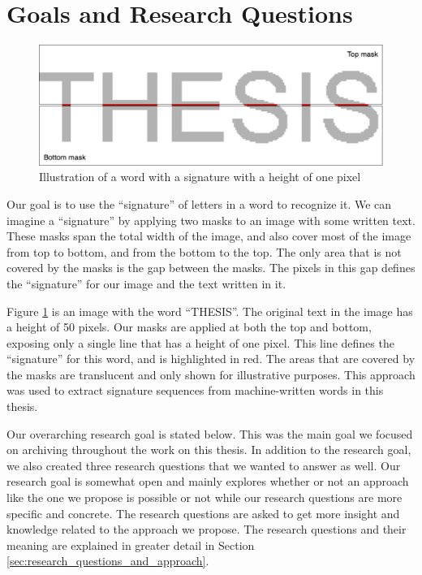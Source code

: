 
\section{Goals and Research Questions}
\label{sec:goals_and_research_questions}
\begin{figure}[ht]
    \centering
    \includegraphics[width=1.\textwidth]{fig/chapter1/signature2.png}
    \caption{Illustration of a word with a signature with a height of one pixel}
    \label{fig:thesis-signature}
\end{figure}

Our goal is to use the ``signature'' of letters in a word to recognize it. We can imagine a ``signature'' by applying two masks to an image with some written text. These masks span the total width of the image, and also cover most of the image from top to bottom, and from the bottom to the top. The only area that is not covered by the masks is the gap between the masks. The pixels in this gap defines the ``signature'' for our image and the text written in it.

Figure \ref{fig:thesis-signature} is an image with the word ``THESIS''. The original text in the image has a height of 50 pixels. Our masks are applied at both the top and bottom, exposing only a single line that has a height of one pixel. This line defines the ``signature'' for this word, and is highlighted in red. The areas that are covered by the masks are translucent and only shown for illustrative purposes. This approach was used to extract signature sequences from machine-written words in this thesis.

Our overarching research goal is stated below. This was the main goal we focused on archiving throughout the work on this thesis. In addition to the research goal, we also created three research questions that we wanted to answer as well. Our research goal is somewhat open and mainly explores whether or not an approach like the one we propose is possible or not while our research questions are more specific and concrete. The research questions are asked to get more insight and knowledge related to the approach we propose. The research questions and their meaning are explained in greater detail in Section \ref{sec:research_questions_and_approach}.

